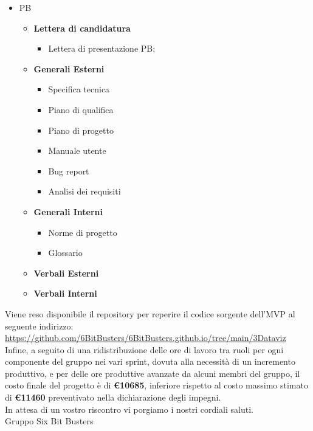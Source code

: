 \begin{titlepage}
        \begin{itemize}
                \item PB
                \begin{itemize}
                        \item \textbf{Lettera di candidatura}
                        \begin{itemize}
                                \item Lettera di presentazione PB;
                        \end{itemize}
                        \item \textbf{Generali Esterni}
                        \begin{itemize}
                                \item Specifica tecnica
                                \item Piano di qualifica
                                \item Piano di progetto
                                \item Manuale utente
                                \item Bug report
                                \item Analisi dei requisiti
                        \end{itemize}
                        \item \textbf{Generali Interni}
                        \begin{itemize}
                                \item Norme di progetto
                                \item Glossario
                        \end{itemize}
                        \item \textbf{Verbali Esterni}
                        \item \textbf{Verbali Interni}
                \end{itemize}
        \end{itemize}

        

        \noindent Viene reso disponibile il repository per reperire il codice sorgente dell'MVP al seguente indirizzo: 
        \url{https://github.com/6BitBusters/6BitBusters.github.io/tree/main/3Dataviz}\\

        \noindent Infine, a seguito di una ridistribuzione delle ore di lavoro tra ruoli per ogni componente del gruppo nei vari sprint, dovuta alla necessità di un incremento produttivo, e per delle ore produttive avanzate da alcuni membri del gruppo, il costo finale del progetto è di \textbf{\euro 10685}, inferiore rispetto al
        costo massimo stimato di \textbf{\euro 11460} preventivato nella dichiarazione degli impegni.\\
	
	\noindent In attesa di un vostro riscontro vi porgiamo i nostri cordiali saluti.\\
        Gruppo Six Bit Busters
	
\end{titlepage}
